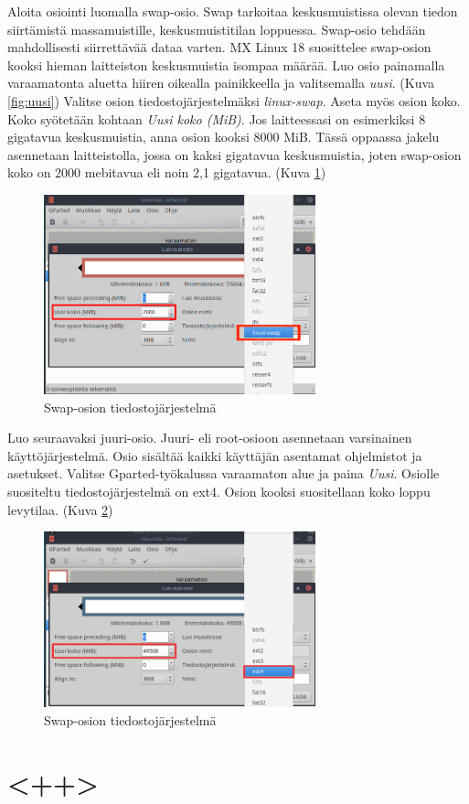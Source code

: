 \documentclass[a4paper, 12pt, finnish]{article}
\begin{document}
Aloita osiointi luomalla swap-osio. Swap tarkoitaa keskusmuistissa olevan tiedon siirtämistä massamuistille, keskusmuistitilan loppuessa. 
Swap-osio tehdään mahdollisesti siirrettävää dataa varten. MX Linux 18 suosittelee swap-osion kooksi hieman laitteiston keskusmuistia isompaa määrää. Luo osio painamalla varaamatonta aluetta hiiren oikealla painikkeella ja valitsemalla \textit{uusi}. (Kuva \ref{fig:uusi})
Valitse osion tiedostojärjestelmäksi \textit{linux-swap}.
Aseta myös osion koko. Koko syötetään kohtaan \textit{Uusi koko (MiB)}. Jos laitteessasi on esimerkiksi 8 gigatavua keskusmuistia, anna osion kooksi 8000 MiB. Tässä oppaassa jakelu asennetaan laitteistolla, jossa on kaksi gigatavua keskusmuistia, joten swap-osion koko on 2000 mebitavua eli noin 2,1 gigatavua. (Kuva \ref{fig:swap})
\clearpage
\begin{figure}[htpb]
    \begin{center}
        \includegraphics[width=0.7\textwidth]{asen/osiointi_gparted_swap}
        \caption{Swap-osion tiedostojärjestelmä}
        \label{fig:swap}
    \end{center}
\end{figure}



Luo seuraavaksi juuri-osio. Juuri- eli root-osioon asennetaan varsinainen käyttöjärjestelmä. Osio sisältää kaikki käyttäjän asentamat ohjelmistot ja asetukset. Valitse Gparted-työkalussa varaamaton alue ja paina \textit{Uusi}. Osiolle suositeltu tiedostojärjestelmä on ext4. Osion kooksi suositellaan koko loppu levytilaa. (Kuva \ref{fig:root})

\begin{figure}[htpb]
    \begin{center}
        \includegraphics[width=0.7\textwidth]{asen/osiointi_gparted_root}
        \caption{Swap-osion tiedostojärjestelmä}
        \label{fig:root}
    \end{center}
\end{figure}
\section{<++>}
\end{document}
